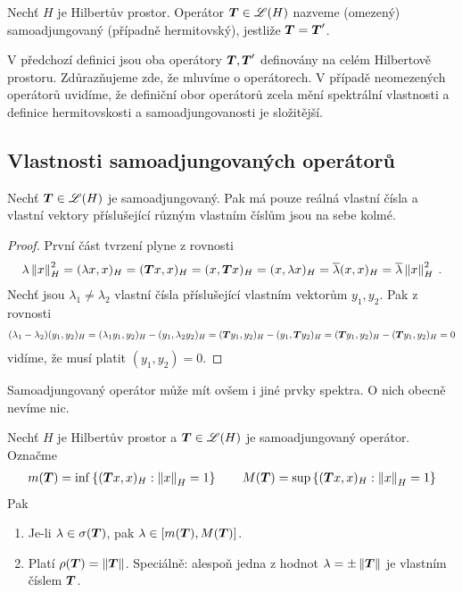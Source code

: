 \begin{definition}
Nechť $H$ je Hilbertův prostor. Operátor $\boldsymbol{T} \in \mathscr{L}(H)$ nazveme (omezený) samoadjungovaný  (případně hermitovský), jestliže $\boldsymbol{T} = \boldsymbol{T}'$.
\end{definition}
\begin{remark}
V předchozí definici jsou oba operátory $\boldsymbol{T}, \boldsymbol{T}'$ definovány na celém Hilbertově prostoru. Zdůrazňujeme zde, že mluvíme o  operátorech. V případě neomezených operátorů uvidíme, že definiční obor operátorů zcela mění spektrální vlastnosti a definice hermitovskosti a samoadjungovanosti je složitější.
\end{remark}

\subsection{Vlastnosti samoadjungovaných operátorů}

\begin{lemma}
Nechť $\boldsymbol{T} \in \mathscr{L} (H)$ je samoadjungovaný. Pak má pouze reálná vlastní čísla a vlastní vektory příslušející různým vlastním číslům jsou na sebe kolmé.
\end{lemma}
\begin{proof}
První část tvrzení plyne z rovnosti \begin{align*}
\lambda \left\lVert x\right\rVert^2_H = (\lambda x, x)_H = (\boldsymbol{T} x,x)_H = (x, \boldsymbol{T} x)_H = (x, \lambda x)_H = \overline{\lambda} (x,x)_H = \overline{\lambda} \left\lVert x\right\rVert_H ^2 \:.
\end{align*}
Nechť jsou $\lambda_1 \neq \lambda_2$ vlastní čísla příslušející vlastním vektorům $y_1,y_2$. Pak z rovnosti \begin{align*}
    (\lambda_1 - \lambda_2)(y_1,y_2)_H = (\lambda_1 y_1,y_2)_H - (y_1, \lambda_2 y_2)_H = (\boldsymbol{T} y_1, y_2)_H - (y_1, \boldsymbol{T} y_2)_H = (\boldsymbol{T} y_1,y_2)_H - (\boldsymbol{T} y_1,y_2)_H = 0
\end{align*}
vidíme, že musí platit $(y_1,y_2)=0$.
\end{proof}
\begin{remark}
Samoadjungovaný operátor může mít ovšem i jiné prvky spektra. O nich obecně nevíme nic.
\end{remark}
\begin{theorem}
Nechť $H$ je Hilbertův prostor a $\boldsymbol{T} \in \mathscr{L} (H)$ je samoadjungovaný operátor. Označme \begin{align*}
    m(\boldsymbol{T}) = \inf \left \lbrace (\boldsymbol{T} x,x)_H : \left\lVert x\right\rVert_H = 1 \right \rbrace \qquad M(\boldsymbol{T}) = \sup \left \lbrace (\boldsymbol{T} x,x)_H : \left\lVert x\right\rVert_H = 1 \right \rbrace
\end{align*} Pak \begin{enumerate}
    \item Je-li $\lambda \in \sigma(\boldsymbol{T})$, pak $\lambda \in [m(\boldsymbol{T}), M(\boldsymbol{T})]$.
    \item Platí $\rho(\boldsymbol{T}) = \left\lVert\boldsymbol{T}\right\rVert$. Speciálně: alespoň jedna z hodnot $\lambda = \pm \left\lVert\boldsymbol{T}\right\rVert$ je vlastním číslem $\boldsymbol{T}$.
\end{enumerate}
\end{theorem} 

